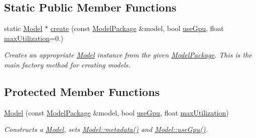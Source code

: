 \subsection*{Static Public Member Functions}
\begin{DoxyCompactItemize}
\item 
static \hyperlink{classdg_1_1deepcore_1_1classification_1_1_model}{Model} $\ast$ \hyperlink{group___classification_module_ga7b908a0f56b71ac72ae872e903a042e2}{create} (const \hyperlink{classdg_1_1deepcore_1_1classification_1_1_model_package}{Model\+Package} \&model, bool \hyperlink{group___classification_module_gaea38e3353458ab22d099d54411d6f868}{use\+Gpu}, float \hyperlink{group___classification_module_ga08d73772f04eb0553e4d787c69b34aa2}{max\+Utilization}=0.)
\begin{DoxyCompactList}\small\item\em Creates an appropriate \hyperlink{classdg_1_1deepcore_1_1classification_1_1_model}{Model} instance from the given \hyperlink{classdg_1_1deepcore_1_1classification_1_1_model_package}{Model\+Package}. This is the main factory method for creating models. \end{DoxyCompactList}\end{DoxyCompactItemize}
\subsection*{Protected Member Functions}
\begin{DoxyCompactItemize}
\item 
\hyperlink{group___classification_module_gac3f95551de3a41eb2bbda756cda5fc07}{Model} (const \hyperlink{classdg_1_1deepcore_1_1classification_1_1_model_package}{Model\+Package} \&model, bool \hyperlink{group___classification_module_gaea38e3353458ab22d099d54411d6f868}{use\+Gpu}, float \hyperlink{group___classification_module_ga08d73772f04eb0553e4d787c69b34aa2}{max\+Utilization})
\begin{DoxyCompactList}\small\item\em Constructs a \hyperlink{classdg_1_1deepcore_1_1classification_1_1_model}{Model}, sets \hyperlink{group___classification_module_ga33bdb8fac324a49d0e70175a1440cdd1}{Model\+::metadata()} and \hyperlink{group___classification_module_gaea38e3353458ab22d099d54411d6f868}{Model\+::use\+Gpu()}. \end{DoxyCompactList}\end{DoxyCompactItemize}
